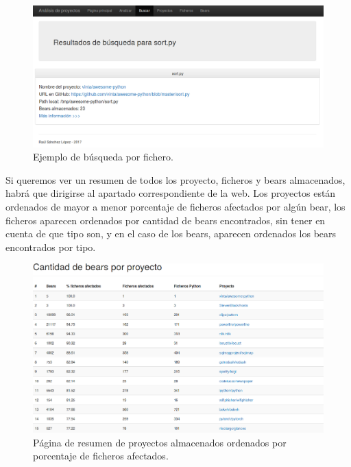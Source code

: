 \documentclass[a4paper, 12pt]{book}
\begin{document}
\begin{figure}[H]
  \centering
  \includegraphics[width=12cm, keepaspectratio]{img/resultadoBuscar}
  \caption{Ejemplo de búsqueda por fichero.}
  \label{fig:resultadoBuscar}
\end{figure}

Si queremos ver un resumen de todos los proyecto, ficheros y bears almacenados, habrá que dirigirse al apartado correspondiente de la web. Los proyectos están ordenados de mayor a menor porcentaje de ficheros afectados por algún bear, los ficheros aparecen ordenados por cantidad de bears encontrados, sin tener en cuenta de que tipo son, y en el caso de los bears, aparecen ordenados los bears encontrados por tipo.

\begin{figure}[H]
  \centering
  \includegraphics[width=15cm, keepaspectratio]{img/resumenProyectos}
  \caption{Página de resumen de proyectos almacenados ordenados por porcentaje de ficheros afectados.}
  \label{fig:resumenProyectos}
\end{figure}
\end{document}
